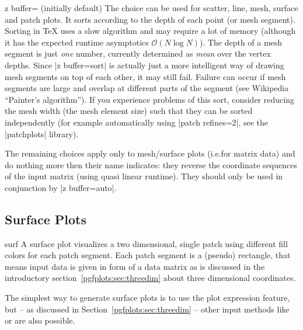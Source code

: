 {\begin{pgfplotskey}{z buffer= (initially default)%
}
    The choice  can be used for scatter, line, mesh, surface
    and patch plots. It sorts according to the depth of each point (or mesh
    segment). Sorting in \TeX{} uses a slow algorithm and may require a lot of
    memory (although it has the expected runtime asymptotics $\mathcal O(N \log
    N)$). The depth of a mesh segment is just \emph{one} number, currently
    determined as \emph{mean} over the vertex depths. Since |z buffer=sort| is
    actually just a more intelligent way of drawing mesh segments on top of
    each other, it may still fail. Failure can occur if mesh segments are large
    and overlap at different parts of the segment (see Wikipedia ``Painter's
    algorithm''). If you experience problems of this sort, consider reducing
    the mesh width (the mesh element size) such that they can be sorted
    independently (for example automatically using |patch refines=2|, see the
    |patchplots| library).

    The remaining choices apply only to mesh/surface plots (i.e.\@ for matrix
    data) and do nothing more then their name indicates: they reverse the
    coordinate sequences of the input matrix (using quasi linear runtime). They
    should only be used in conjunction by |z buffer=auto|.
\end{pgfplotskey}


\subsection{Surface Plots}
\label{sec:pgfplots:surfplots}

\begin{plottype}[/pgfplots]{surf}
    A surface plot visualizes a two dimensional, single patch using different
    fill colors for each patch segment. Each patch segment is a (pseudo)
    rectangle, that means input data is given in form of a data matrix as is
    discussed in the introductory section~\ref{pgfplots:sec:threedim} about
    three dimensional coordinates.

\pgfplotsexpensiveexample
\begin{codeexample}[]
\end{codeexample}

    The simplest way to generate surface plots is to use the plot expression
    feature, but -- as discussed in Section~\ref{pgfplots:sec:threedim} --
    other input methods like  or
     are also possible.


\end{plottype}}
